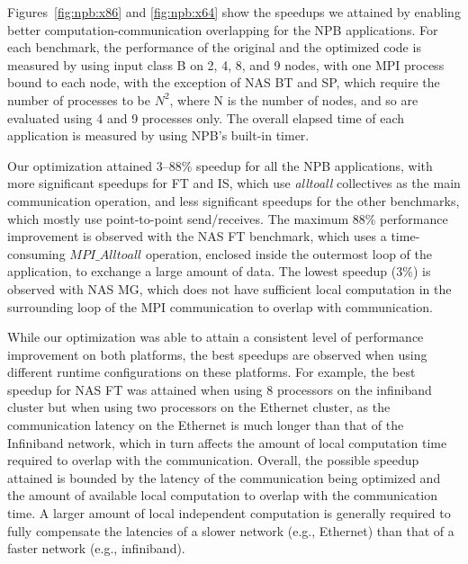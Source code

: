 Figures~\ref{fig:npb:x86} and \ref{fig:npb:x64} show the speedups we
attained by enabling better computation-communication overlapping for
the NPB applications.  For each benchmark, the
performance of the original and the optimized code is
measured by using input class B on 2, 4, 8, and 9 nodes, with one MPI
process bound to each node, with the exception of NAS BT and SP, which
require the number of processes to be $N^2$, where N is the number of nodes, and so are
evaluated using 4 and 9 processes only.  The overall elapsed time of
each application is measured by using NPB's built-in timer. 

Our optimization attained 3--88\% speedup for all the NPB applications, 
with more significant speedups for FT and IS, which 
use {\em alltoall} collectives as the main communication operation, 
and less significant speedups for the other benchmarks, which mostly use point-to-point send/receives.  
The maximum 88\% performance improvement is observed with the NAS FT
benchmark, which uses a time-consuming $MPI\_Alltoall$ operation,
enclosed inside the outermost loop of the application, to exchange a
large amount of data.  The lowest speedup (3\%) is observed with NAS
MG, which does not have sufficient local computation in the
surrounding loop of the MPI communication to overlap with
communication. 


While our optimization was able to attain a consistent level of performance improvement on both platforms, 
the best speedups are observed when using different runtime configurations on these platforms. 
For example, the best speedup for NAS FT was attained when using 8 processors on the infiniband cluster
but when using two processors on the Ethernet cluster, as the communication latency on the Ethernet is much longer than 
that of the Infiniband network, which in turn affects the amount of local computation time required to overlap with the communication.
Overall,  the possible speedup attained is bounded by the latency of the communication being optimized and the amount of available
local computation to overlap with the communication time. A larger amount of local independent computation is generally required to fully compensate the latencies of a slower network (e.g., Ethernet) than that of a faster network (e.g., infiniband).
